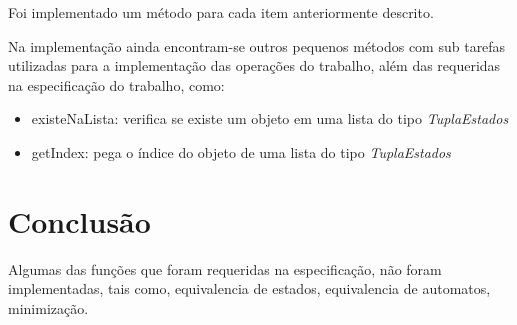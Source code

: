 \documentclass[a4paper,portuguese,12pt]{article}
\begin{document}
Foi implementado um método para cada item anteriormente descrito.

Na implementação ainda encontram-se outros pequenos métodos com sub tarefas utilizadas para a implementação das operações do trabalho, além das requeridas na especificação do trabalho, como:

\begin{itemize}
\item existeNaLista: verifica se existe um objeto em uma lista do tipo \textit{TuplaEstados}
\item getIndex: pega o índice do objeto de uma lista do tipo \textit{TuplaEstados} 
\end{itemize}

\section{Conclusão}
Algumas das funções que foram requeridas na especificação, não foram implementadas, tais como, equivalencia de estados, equivalencia de automatos, minimização.


\end{document}
